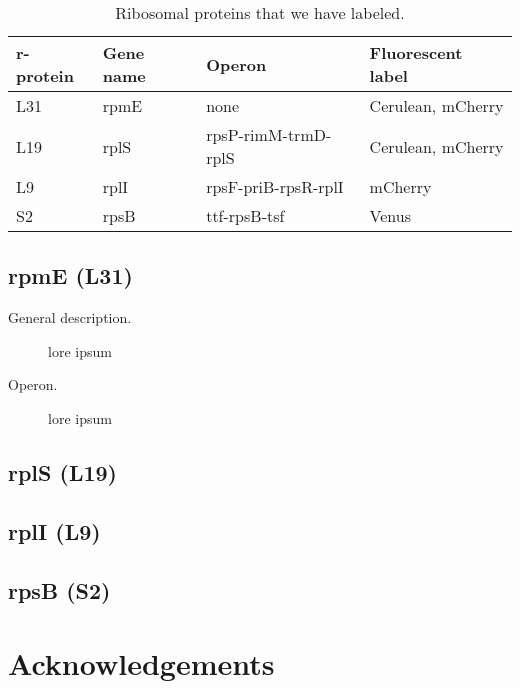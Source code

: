 			

\begin{table}                       
\begin{tabular}{ l l l l }
    \centering
    r-protein & Gene name & Operon & Fluorescent label \\ 
    \hline
    L31 & rpmE & none & Cerulean, mCherry \\ 
    L19 & rplS & rpsP-rimM-trmD-rplS & Cerulean, mCherry \\ 
    L9 & rplI & rpsF-priB-rpsR-rplI & mCherry \\ 
    S2 & rpsB & ttf-rpsB-tsf & Venus\\ 

\end{tabular}
    \caption{Ribosomal proteins that we have labeled.} \label{tab:ribolabeledprots}
\end{table}



\subsection{rpmE (L31)}
\begin{description}
    \item[General description.] lore ipsum
    \item[Operon.] lore ipsum
\end{description}



\subsection{rplS (L19)}


\subsection{rplI (L9)}


\subsection{rpsB (S2)}












\section*{Acknowledgements}

